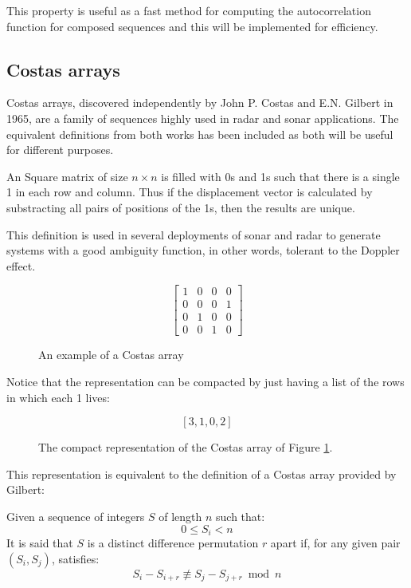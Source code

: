 This property is useful  as a fast method for computing the autocorrelation function for composed sequences and this will be implemented for efficiency. 

\subsection{Costas arrays}

Costas arrays, discovered independently by John P. Costas\cite{costas_costas}
and E.N. Gilbert \cite{gilbert_costas} in 1965, are a family of sequences highly
used in radar and sonar applications. The equivalent definitions from both works has been included as both will be useful for different purposes.

\begin{definition}
 An Square matrix of size $n×n$  is filled with 0s and 1s such that there is a single
 1 in each row and column. Thus if the
  displacement vector is calculated by substracting all pairs of positions of the 1s, then  the results are unique.
\end{definition}

This definition is used in several deployments of sonar and radar to generate
systems with a good ambiguity function, in other words, tolerant to the Doppler
effect.

\begin{figure}[ht!]
  $$
  \begin{bmatrix}
   1&0&0&0\\
   0&0&0&1\\
   0&1&0&0\\
   0&0&1&0
  \end{bmatrix}
  $$
  \caption{An example of a Costas array}
  \label{fig:costas_1}
\end{figure}

Notice that the representation can be compacted by just having a list of the
rows in which each 1 lives:

\begin{figure}[ht!]
  $$[3, 1, 0, 2]$$
  \caption{The compact representation of the Costas array of Figure
  \ref{fig:costas_1}.}
  \label{fig:costas_2}
\end{figure}

This representation is equivalent to the definition of a Costas array provided
by Gilbert:

\begin{definition}\label{def:costas_1}
  Given a sequence of integers $S$ of length $n$ such that:
    \begin{equation}\label{eq:costas_1}
      0 \leq S_{i} < n
    \end{equation}
  It is said that $S$ is a distinct difference permutation $r$ apart if,
  for any given pair $(S_{i}, S_{j})$, satisfies:
    \begin{equation}\label{eq:costas_2}
      S_{i} - S_{i+r} \not \equiv S_{j} - S_{j+r} \bmod n
    \end{equation}
\end{definition}

